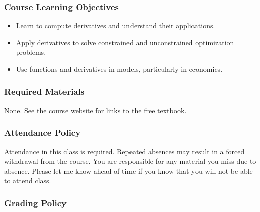 \documentclass[10pt]{article}
\begin{document}
%

\subsubsection*{Course Learning Objectives}

\begin{itemize}

\item Learn to compute derivatives and understand their applications.
\item Apply derivatives to solve constrained and unconstrained optimization problems.
\item Use functions and derivatives in models, particularly in economics.

\end{itemize}


\subsubsection*{Required Materials}

None. See the course website for links to the free textbook.

%
\subsubsection*{Attendance Policy}

Attendance in this class is required. Repeated absences may result in a forced withdrawal from the course. You are responsible for any material you miss due to absence. Please let me know ahead of time if you know that you will not be able to attend class.

\subsubsection*{Grading Policy}
\end{document}
